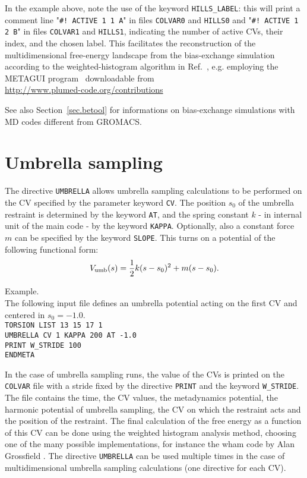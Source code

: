 \documentclass[12pt,fleqn]{report}
\newcommand{\keyword}[1]{\index{Keywords!{\tt #1}} {\tt #1}}
\newcommand{\esempio}[1]{
\vspace{10pt}
\begin{flushright}
\colorbox{light-gray}{
   \begin{minipage}{13cm}
       \scriptsize{
{\fontfamily{phv} \fontseries{b}
 \selectfont Example. \\
 \fontseries{m} \selectfont #1 } }
\end{minipage}}
\end{flushright}
\vspace{20pt}
}
\begin{document}
In the example above, note the use of the keyword \keyword{HILLS\_LABEL}: this will print a comment line 
"{\tt \#! ACTIVE 1 1 A}" in files {\tt COLVAR0} and {\tt HILLS0} and "{\tt \#! ACTIVE 1 2 B}" in files {\tt COLVAR1} and {\tt HILLS1},
indicating the number of active CVs, their index, and the chosen label. 
This facilitates the reconstruction of the multidimensional free-energy landscape from the bias-exchange simulation
according to the weighted-histogram algorithm in Ref.~\cite{marinelli-trpc09},
e.g. employing the METAGUI program~\cite{METAGUI} downloadable from \\ \url{http://www.plumed-code.org/contributions}

See also Section~\ref{sec.betool} for informations on bias-exchange simulations with MD codes different from GROMACS.

\newpage

\section{Umbrella sampling}
 The directive \keyword{UMBRELLA}  allows
 umbrella sampling calculations to be performed on
 the CV specified by the parameter keyword {\tt CV}.
 The position $s_0$ of the umbrella restraint is determined by
 the keyword {\tt AT}, and the spring constant $k$ -
  in internal unit of the main code -  by the keyword {\tt KAPPA}.
Optionally, also a constant force $m$ can be specified
by the keyword {\tt SLOPE}.
 This turns on a potential of the following functional form:
 \begin{equation}
 V_{\rm umb}(s)=\frac{1}{2} {k}(s- s_0)^2 + m(s-s_0).
\label{umbrella_potential}
 \end{equation} 

 \esempio{The following input file defines an umbrella potential acting on the 
 first CV and centered in $s_0=-1.0$.  \vspace{10pt}\\
{\tt TORSION LIST 13 15 17 1 \\
UMBRELLA CV 1 KAPPA  200 AT -1.0 \\
PRINT W\_STRIDE 100 \\
ENDMETA}}

In the case of umbrella sampling runs, 
 the value of the CVs is printed on the {\tt COLVAR} file with a stride
 fixed by the directive {\tt PRINT} and the keyword {\tt W\_STRIDE}. 
The file contains the time, the CV values, the
metadynamics potential, the harmonic potential of umbrella sampling,
the CV on which the restraint acts and the position of the restraint.
The final calculation of the free energy as a function of this 
CV can be done using the weighted histogram analysis method,
 choosing one of the many possible 
 implementations, for instance the wham code by Alan Grossfield 
 \cite{grossfield}.
 The directive {\tt UMBRELLA} can be used multiple times in the case of  multidimensional
 umbrella sampling calculations (one directive for each CV).
\end{document}
